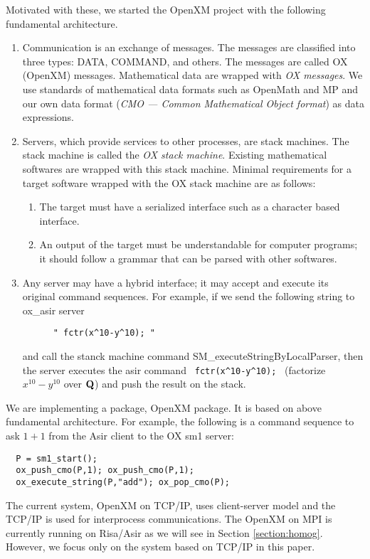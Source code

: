 Motivated with these, we started the OpenXM project with the following
fundamental architecture.
\begin{enumerate}
\item Communication is an exchange of messages. The messages are classified into
three types:
DATA, COMMAND, and others.
The messages are called OX (OpenXM) messages.
Mathematical data are wrapped with {\it OX messages}.
We use standards of mathematical data formats such as OpenMath and MP
and our own data format ({\it CMO --- Common Mathematical Object format})
as data expressions.
\item Servers, which provide services to other processes, are stack machines.
The stack machine is called the
{\it OX stack machine}.
Existing mathematical softwares are wrapped with this stack machine.
Minimal requirements for a target software wrapped with the OX stack machine
are as follows:
\begin{enumerate}
\item The target must have a serialized interface such as a character based
interface.
\item An output of the target must be understandable for computer programs;
it should follow a grammar that can be parsed with other softwares.
\end{enumerate}
\item Any server may have a hybrid interface;
it may accept and execute its original command sequences.
For example,
if we send the following string to ox\_asir server
{\footnotesize
\begin{verbatim}
      " fctr(x^10-y^10); "
\end{verbatim}
}
and call the stanck machine command
SM\_executeStringByLocalParser,
then the server executes the asir command
\verb+ fctr(x^10-y^10); + 
(factorize $x^10-y^10$ over ${\bf Q}$)
and push the result on the stack.
\end{enumerate}
We are implementing a package, OpenXM package.  
It is based on above fundamental architecture.
For example, the following is a command sequence to ask $1+1$ from
the Asir client to the OX sm1 server:
\begin{verbatim}
  P = sm1_start();
  ox_push_cmo(P,1); ox_push_cmo(P,1);
  ox_execute_string(P,"add"); ox_pop_cmo(P);
\end{verbatim}
The current system, OpenXM on TCP/IP, 
uses client-server model and the TCP/IP is used for interprocess
communications.
The OpenXM on MPI \cite{MPI} is currently running on Risa/Asir
as we will see in Section \ref{section:homog}.
However, we focus only on the system based on TCP/IP in this paper.




